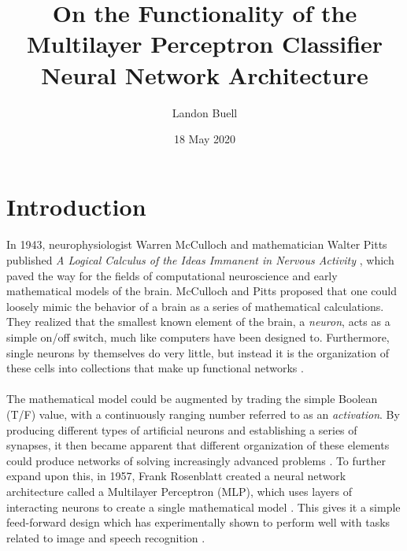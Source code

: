 \documentclass[12pt,letterpaper]{article}
\begin{document}

\title{On the Functionality of the Multilayer Perceptron Classifier Neural Network Architecture}
\date{18 May 2020}
\author{Landon Buell}
\maketitle


\section*{Introduction}

\paragraph*{}In 1943, neurophysiologist Warren McCulloch and mathematician Walter Pitts published \textit{A Logical Calculus of the Ideas Immanent in Nervous Activity} \cite{McCulloch}, which paved the way for the fields of computational neuroscience and early mathematical models of the brain. McCulloch and Pitts proposed that one could loosely mimic the behavior of a brain as a series of mathematical calculations. They realized that the smallest known element of the brain, a \textit{neuron}, acts as a simple on/off switch, much like computers have been designed to. Furthermore, single neurons by themselves do very little, but instead it is the organization of these cells into collections that make up functional networks \cite{Geron,Levine,McCulloch}. 

\paragraph*{}The mathematical model could be augmented by trading the simple Boolean (T/F) value, with a continuously ranging number referred to as an \textit{activation}. By producing different types of artificial neurons and establishing a series of synapses, it then became apparent that different organization of these elements could produce networks of solving increasingly advanced problems \cite{Goodfellow}. To further expand upon this, in 1957, Frank Rosenblatt created a neural network architecture called a Multilayer Perceptron (MLP), which uses layers of interacting neurons to create a single mathematical model \cite{Geron,Petrik}. This gives it a simple feed-forward design which has experimentally shown to perform well with tasks related to image and speech recognition \cite{Goodfellow,Loy}.
\end{document}
